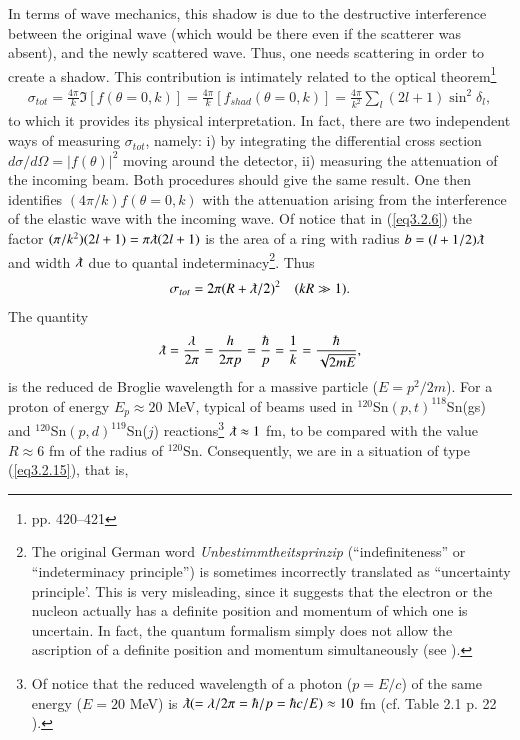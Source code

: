 In terms of wave mechanics, this shadow is due to the destructive interference between the original wave (which would be there even if the scatterer was absent), and the newly scattered wave. Thus, one needs scattering in order to create a shadow. This contribution is intimately related to the optical theorem\footnote{\cite{Sakurai:94} pp. 420--421}
\begin{align}\label{eq3.2.9}
\sigma_{tot}=\frac{4\pi}{k}\Im[f(\theta=0,k)]=\frac{4\pi}{k}[f_{shad}(\theta=0,k)]=\frac{4\pi}{k^2}\sum_l(2l+1)\sin^2\delta_l,
\end{align}
to which it provides its physical interpretation. In fact,  there are two independent ways of measuring $\sigma_{tot}$, namely: i) by integrating the differential cross section $d\sigma/d\Omega=|f(\theta)|^2$ moving around the detector, ii) measuring the attenuation of the incoming beam. Both procedures should give the same result. One then identifies $(4\pi/k)f(\theta=0,k)$ with the attenuation arising from the interference of the elastic wave with the incoming wave. Of notice that in (\ref{eq3.2.6}) the factor $(\pi/k^2)(2l+1)=\pi\lambdabar(2l+1)$ is the area of a ring  with radius $b=(l+1/2)\lambdabar$ and width $\lambdabar$ due to quantal indeterminacy\footnote{The original German word \textit{Unbestimmtheitsprinzip} (``indefiniteness'' or ``indeterminacy principle'') is sometimes incorrectly translated as ``uncertainty principle'. This is very misleading, since it suggests that the electron or the nucleon actually has a definite position and momentum of which one is uncertain. In fact, the quantum formalism simply does not allow the ascription of a definite position and momentum simultaneously (see \cite{Leggett:87}).}. Thus
\begin{align}\label{eq3.2.15}
\sigma_{tot}=2\pi(R+\lambdabar/2)^2\quad(kR\gg1).
\end{align}
The quantity
\begin{align}\label{eq3.2.16}
\lambdabar=\frac{\lambda}{2\pi}=\frac{h}{2\pi p}=\frac{\hbar}{p}=\frac{1}{k}=\frac{\hbar}{\sqrt{2mE}},
\end{align}
is the reduced de Broglie wavelength for a massive particle ($E=p^2/2m$). For a proton of energy $E_p\approx 20$ MeV, typical of beams used in $^{120}$Sn$(p,t)^{118}$Sn(gs) and $^{120}$Sn$(p,d)^{119}$Sn($j$) reactions\footnote{Of notice that the reduced wavelength of a photon ($p=E/c$) of the same energy ($E= 20$ MeV) is $\lambdabar (=\lambda/2\pi=\hbar/p=\hbar c/E)\approx 10$ fm (cf. Table 2.1 p. 22 \cite{Satchler:80}).} $\lambdabar\approx 1$ fm, to be compared with the value $R\approx 6$ fm of the radius of $^{120}$Sn. Consequently, we are in a situation of type (\ref{eq3.2.15}), that is,
